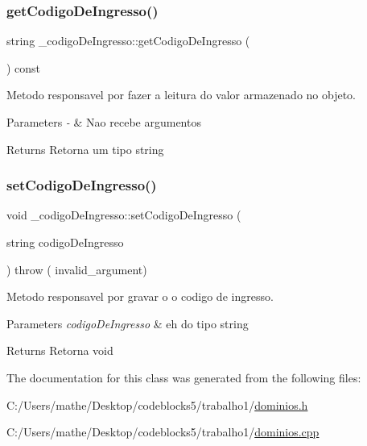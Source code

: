 \subsubsection{\texorpdfstring{getCodigoDeIngresso()}{getCodigoDeIngresso()}}
{\footnotesize\ttfamily string \+\_\+codigo\+De\+Ingresso\+::get\+Codigo\+De\+Ingresso (\begin{DoxyParamCaption}{ }\end{DoxyParamCaption}) const\hspace{0.3cm}{\ttfamily [inline]}}



Metodo responsavel por fazer a leitura do valor armazenado no objeto. 


\begin{DoxyParams}{Parameters}
{\em -\/} & Nao recebe argumentos \\
\hline
\end{DoxyParams}
\begin{DoxyReturn}{Returns}
Retorna um tipo string 
\end{DoxyReturn}
\mbox{\label{class__codigo_de_ingresso_a7674d910334b1d7e41cd792856770630}} 
\subsubsection{\texorpdfstring{setCodigoDeIngresso()}{setCodigoDeIngresso()}}
{\footnotesize\ttfamily void \+\_\+codigo\+De\+Ingresso\+::set\+Codigo\+De\+Ingresso (\begin{DoxyParamCaption}\item[{string}]{codigo\+De\+Ingresso }\end{DoxyParamCaption}) throw ( invalid\+\_\+argument) }



Metodo responsavel por gravar o o codigo de ingresso. 


\begin{DoxyParams}{Parameters}
{\em codigo\+De\+Ingresso} & eh do tipo string \\
\hline
\end{DoxyParams}
\begin{DoxyReturn}{Returns}
Retorna void 
\end{DoxyReturn}


The documentation for this class was generated from the following files\+:\begin{DoxyCompactItemize}
\item 
C\+:/\+Users/mathe/\+Desktop/codeblocks5/trabalho1/\mbox{\hyperlink{dominios_8h}{dominios.\+h}}\item 
C\+:/\+Users/mathe/\+Desktop/codeblocks5/trabalho1/\mbox{\hyperlink{dominios_8cpp}{dominios.\+cpp}}\end{DoxyCompactItemize}
